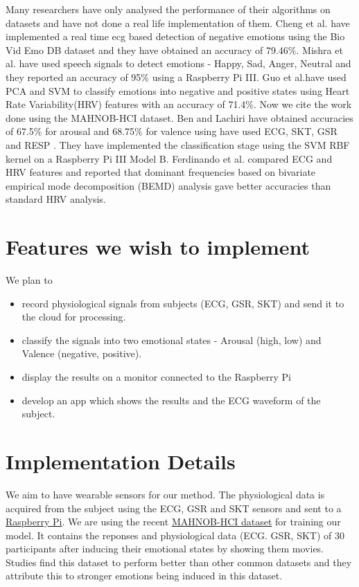 \documentclass[11pt]{article}
\theoremstyle{definition}
\begin{document}
    Many researchers have only analysed the performance of their algorithms on datasets and have not done a real life implementation of them.
    Cheng et al.\cite{cheng_novel_2017} have implemented a real time ecg based detection of negative emotions using the Bio Vid Emo DB dataset and they have obtained an accuracy of 79.46\%. 
    Mishra et al.\cite{mishra_real_2017} have used speech signals to detect emotions - Happy, Sad, Anger, Neutral and they reported an accuracy of 95\% using a Raspberry Pi III.
    Guo et al.\cite{guo_heart_2016}have used PCA and SVM to classify emotions into negative and positive states using Heart Rate Variability(HRV) features with an accuracy of 71.4\%.
    Now we cite the work done using the MAHNOB-HCI dataset\cite{soleymani_multimodal_2012}. 
    Ben and Lachiri\cite{ben_emotion_2017} have obtained accuracies of 67.5\% for arousal and 68.75\% for valence using have used ECG, SKT, GSR and RESP . They have implemented the classification stage using the SVM RBF kernel on a Raspberry Pi III Model B.
    Ferdinando et al.\cite{ferdinando_comparing_2016} compared ECG and HRV features and reported that dominant frequencies based on
    bivariate empirical mode decomposition (BEMD) analysis gave better accuracies than standard HRV analysis.
   
  \section{Features we wish to implement}
    We plan to 
    \begin{itemize}
      \item record physiological signals from subjects (ECG, GSR, SKT) and send it to the cloud for processing.
      \item classify the signals into two emotional states - Arousal (high, low) and Valence (negative, positive)\cite{ben_emotion_2017}.
      \item display the results on a monitor connected to the Raspberry Pi
      \item develop an app which shows the results and the ECG waveform of the subject.
    \end{itemize}

  \section{Implementation Details}
We aim to have wearable sensors for our method. The physiological data is acquired from the subject using the ECG, GSR and SKT sensors and sent to a  \href{https://www.raspberrypi.org/}{Raspberry Pi}. We are using the recent \href{https://mahnob-db.eu/hci-tagging/}{ MAHNOB-HCI dataset}\cite{soleymani_multimodal_2012} for training our model. It contains the reponses and physiological data (ECG. GSR, SKT) of 30 participants after inducing their emotional states by showing them movies. 
    Studies find this dataset to perform better than other common datasets and they attribute this to stronger emotions being induced in this dataset.\cite{simon_selection_2016}
\end{document}
